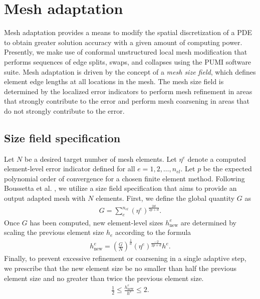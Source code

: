 \section{Mesh adaptation}

Mesh adaptation provides a means to modify the
spatial discretization of a PDE to obtain
greater solution accuracy with a given amount of
computing power. Presently, we make use of conformal
unstructured local mesh modification that performs
sequences of edge splits, swaps, and collapses
\cite{alauzet2006parallel} \cite{li20053d}
using the \textsc{PUMI} \cite{ibanez2016pumi}
software suite. Mesh adaptation is
driven by the concept of a \emph{mesh size field},
which defines element edge lengths at all locations
in the mesh. The mesh size field
is determined by the localized error indicators
to perform mesh refinement in areas that strongly
contribute to the error and perform mesh coarsening
in areas that do not strongly contribute to the error.

\subsection{Size field specification}

Let $N$ be a desired target number of mesh elements.
Let $\eta^e$ denote a computed element-level error indicator
defined for all $e=1,2,\dots,n_{el}$. Let
$p$ be the expected polynomial order of
convergence for a chosen finite element method.
Following Boussetta et al. \cite{boussetta2006adaptive},
we utilize a size field specification that aims to
provide an output adapted mesh with $N$ elements.
First, we define the global quantity $G$ as
\begin{gather}
G = \sum_{e}^{n_{el}} \left( \eta^e \right) ^{\frac{2d}{2p+d}}.
\end{gather}
%
Once $G$ has been computed, new element-level sizes
$h^e_{\text{new}}$ are determined by scaling the previous
element size $h_e$ according to the formula
\begin{gather}
h^e_{\text{new}} =
\left( \frac{G}{N} \right)^{\frac{1}{d}}
\left( \eta^e \right)^{\frac{-2}{2p + d}}
h^e.
\label{eq:size}
\end{gather}
Finally, to prevent excessive refinement or coarsening
in a single adaptive step, we prescribe that the new
element size be no smaller than half the previous
element size and no greater than twice the previous
element size.
%
\begin{gather}
\frac12 \leq \frac{h^e_{\text{new}}}{h^e} \leq 2.
\end{gather}
%

